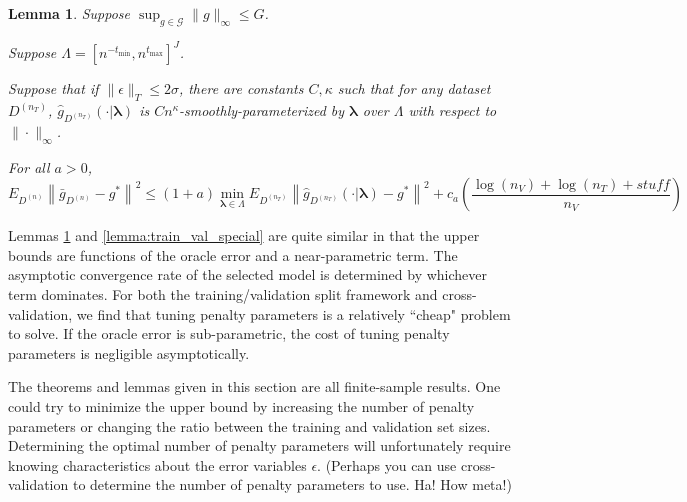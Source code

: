 \documentclass[12pt]{article}
\newtheorem{lemma}{Lemma}
\begin{document}
\begin{lemma}
	\label{lemma:kfold_special}
Suppose $\sup_{g \in \mathcal{G}} \|g\|_\infty \le G$.

Suppose $\Lambda = [n^{-t_{\min}}, n^{t_{\max}}]^J$.

Suppose that if $\|\epsilon\|_{T}\le 2\sigma$, there are constants $C,\kappa$ such that for any dataset $D^{(n_T)}$, $\hat{g}_{D^{(n_T)}}(\cdot | \boldsymbol \lambda)$ is $Cn^\kappa$-smoothly-parameterized by $\boldsymbol \lambda$ over $\Lambda$ with respect to $\| \cdot \|_\infty$.

For all $a > 0$,
\begin{equation}
E_{D^{(n)}} \left \| \bar{g}_{D^{(n)}} - g^* \right \|^2 \le
(1+a) \min_{\boldsymbol{\lambda} \in \Lambda}  E_{D^{(n_T)}} \left \| \hat{g}_{D^{(n_T)}}(\cdot |\boldsymbol \lambda) - g^* \right \|^2
+  c_a \left (\frac{\log(n_V) + \log(n_T) + stuff}{n_V}\right )
\end{equation}
\end{lemma}
Lemmas \ref{lemma:kfold_special} and \ref{lemma:train_val_special} are quite similar in that the upper bounds are functions of the oracle error and a near-parametric term. The asymptotic convergence rate of the selected model is determined by whichever term dominates. For both the training/validation split framework and cross-validation, we find that tuning penalty parameters is a relatively ``cheap" problem to solve. If the oracle error is sub-parametric, the cost of tuning penalty parameters is negligible asymptotically.

The theorems and lemmas given in this section are all  finite-sample results. One could try to minimize the upper bound by increasing the number of penalty parameters or changing the ratio between the training and validation set sizes. Determining the optimal number of penalty parameters will unfortunately require knowing characteristics about the error variables $\epsilon$. (Perhaps you can use cross-validation to determine the number of penalty parameters to use. Ha! How meta!)


\end{document}
